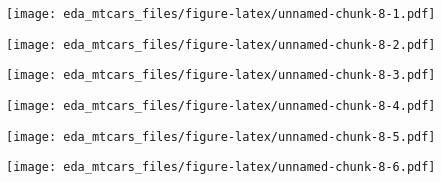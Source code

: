 \documentclass[
]{article}
\newenvironment{Shaded}{\begin{snugshade}}{\end{snugshade}}
\newcommand{\AttributeTok}[1]{\textcolor[rgb]{0.77,0.63,0.00}{#1}}
\newcommand{\DecValTok}[1]{\textcolor[rgb]{0.00,0.00,0.81}{#1}}
\newcommand{\FunctionTok}[1]{\textcolor[rgb]{0.00,0.00,0.00}{#1}}
\newcommand{\NormalTok}[1]{#1}
\newcommand{\SpecialCharTok}[1]{\textcolor[rgb]{0.00,0.00,0.00}{#1}}
\begin{document}
\texttt{[image: eda\_mtcars\_files/figure-latex/unnamed-chunk-8-1.pdf]}

\begin{Shaded}
\end{Shaded}

\texttt{[image: eda\_mtcars\_files/figure-latex/unnamed-chunk-8-2.pdf]}

\begin{Shaded}
\end{Shaded}

\texttt{[image: eda\_mtcars\_files/figure-latex/unnamed-chunk-8-3.pdf]}

\begin{Shaded}
\end{Shaded}

\texttt{[image: eda\_mtcars\_files/figure-latex/unnamed-chunk-8-4.pdf]}

\begin{Shaded}
\end{Shaded}

\texttt{[image: eda\_mtcars\_files/figure-latex/unnamed-chunk-8-5.pdf]}

\begin{Shaded}
\end{Shaded}

\texttt{[image: eda\_mtcars\_files/figure-latex/unnamed-chunk-8-6.pdf]}
\end{document}
